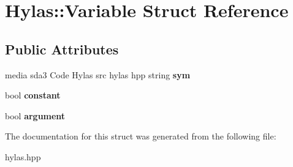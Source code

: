 \hypertarget{structHylas_1_1Variable}{
\section{Hylas::Variable Struct Reference}
\label{structHylas_1_1Variable}
}
\subsection*{Public Attributes}
\begin{DoxyCompactItemize}
\item 
\hypertarget{structHylas_1_1Variable_afb6c3449837e7b9de6b174de9ab08436}{
media sda3 Code Hylas src hylas hpp string {\bfseries sym}}
\label{structHylas_1_1Variable_afb6c3449837e7b9de6b174de9ab08436}

\item 
\hypertarget{structHylas_1_1Variable_a6d303ea037f5535b572e0eadf55ddba2}{
bool {\bfseries constant}}
\label{structHylas_1_1Variable_a6d303ea037f5535b572e0eadf55ddba2}

\item 
\hypertarget{structHylas_1_1Variable_aae7ee4de7e5504443ca99fd7b0ff676c}{
bool {\bfseries argument}}
\label{structHylas_1_1Variable_aae7ee4de7e5504443ca99fd7b0ff676c}

\end{DoxyCompactItemize}


The documentation for this struct was generated from the following file:\begin{DoxyCompactItemize}
\item 
hylas.hpp\end{DoxyCompactItemize}
